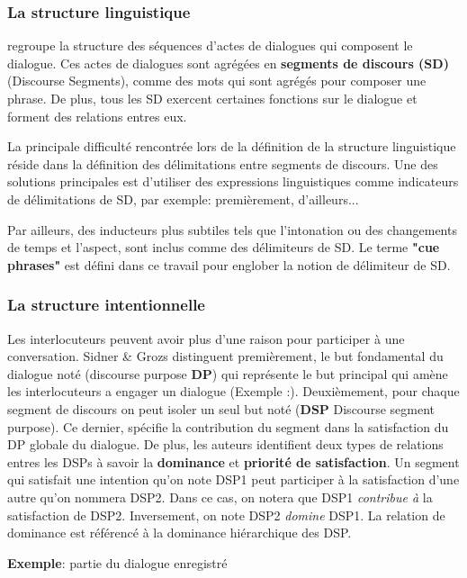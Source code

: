 \documentclass[a4paper,french]{article}
\begin{document}
\subsubsection{La structure linguistique} regroupe la structure des séquences d'actes de dialogues qui composent le dialogue. Ces actes de dialogues sont agrégées en \textbf{segments de discours (SD)} (Discourse Segments), comme des mots qui sont agrégés pour composer une phrase. De plus, tous les SD exercent certaines fonctions sur le dialogue et forment des relations entres eux.  
\par La principale difficulté rencontrée lors de la définition de la structure linguistique réside dans la définition des délimitations entre segments de discours. Une des solutions principales est d'utiliser des expressions linguistiques comme indicateurs de délimitations de SD, par exemple: premièrement, d'ailleurs... 
\par Par ailleurs, des inducteurs plus subtiles tels que l'intonation ou des changements de temps et l'aspect, sont inclus comme des délimiteurs de SD. Le terme \textbf{"cue phrases"} est défini dans ce travail pour englober la notion de délimiteur de SD. 

\subsubsection{La structure intentionnelle} 
Les interlocuteurs peuvent avoir plus d'une raison pour participer à une conversation. Sidner \& Grozs distinguent premièrement, le but fondamental du dialogue noté (discourse purpose \textbf{DP}) qui représente le but principal qui amène les interlocuteurs a engager un dialogue (Exemple :). Deuxièmement, pour chaque segment de discours on peut isoler un seul but noté (\textbf{DSP} Discourse segment purpose). Ce dernier, spécifie la contribution du segment dans la satisfaction du DP globale du dialogue. De plus, les auteurs identifient deux types de relations entres les DSPs à savoir la \textbf{dominance} et \textbf{priorité de satisfaction}. Un segment qui satisfait une intention qu'on note DSP1 peut participer à la satisfaction d'une autre qu'on nommera DSP2. Dans ce cas, on notera que DSP1 \textit{contribue à} la satisfaction de DSP2. Inversement, on note DSP2 \textit{domine} DSP1. La relation de dominance est référencé à la dominance hiérarchique des DSP.

\par \textbf{Exemple}: 
partie du dialogue enregistré
\end{document}
